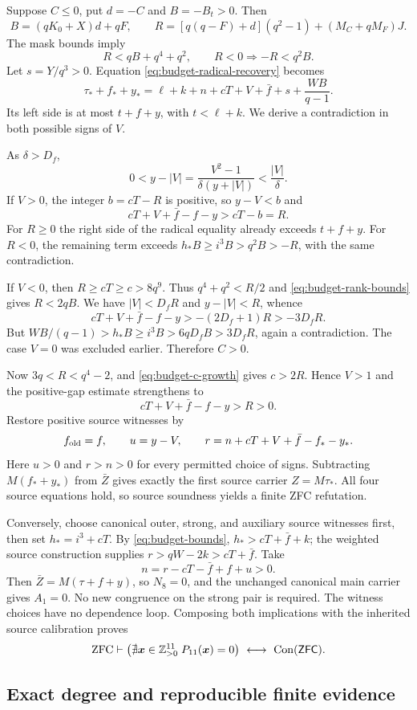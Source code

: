 Suppose $C\le0$, put $d=-C$ and $B=-B_t>0$.  Then
\[
 B=(qK_0+X)d+qF,\qquad
 R=[q(q-F)+d](q^2-1)+(M_C+qM_F)J.
\]
The mask bounds imply
\begin{equation}
 R<qB+q^4+q^2,\qquad R<0\Longrightarrow -R<q^2B.
 \label{eq:budget-rank-bounds}
\end{equation}
Let $s=Y/q^3>0$.  Equation \eqref{eq:budget-radical-recovery} becomes
\[
 \tau_*+f_*+y_*
  =\ell+k+n+cT+V+\bar f+s+\frac{WB}{q-1}.
\]
Its left side is at most $t+f+y$, with $t<\ell+k$.
We derive a contradiction in both possible signs of $V$.

As $\delta>D_f$,
\[
 0<y-|V|=\frac{V^2-1}{\delta(y+|V|)}<\frac{|V|}{\delta}.
\]
If $V>0$, the integer $b=cT-R$ is positive, so $y-V<b$ and
\[
 cT+V+\bar f-f-y>cT-b=R.
\]
For $R\ge0$ the right side of the radical equality already exceeds
$t+f+y$.  For $R<0$, the remaining term exceeds
$h_*B\ge i^3B>q^2B>-R$, with the same contradiction.

If $V<0$, then $R\ge cT\ge c>8q^9$.  Thus
$q^4+q^2<R/2$ and \eqref{eq:budget-rank-bounds} gives $R<2qB$.
We have $|V|<D_fR$ and $y-|V|<R$, whence
\[
 cT+V+\bar f-f-y>-(2D_f+1)R>-3D_fR.
\]
But $WB/(q-1)>h_*B\ge i^3B>6qD_fB>3D_fR$, again a
contradiction.  The case $V=0$ was excluded earlier.  Therefore $C>0$.

Now $3q<R<q^4-2$, and \eqref{eq:budget-c-growth} gives $c>2R$.
Hence $V>1$ and the positive-gap estimate strengthens to
\[
 cT+V+\bar f-f-y>R>0.
\]
Restore positive source witnesses by
\[
 f_{\rm old}=f,\qquad u=y-V,\qquad
 r=n+cT+V+\bar f-f_*-y_*.
\]
Here $u>0$ and $r>n>0$ for every permitted choice of signs.
Subtracting $M(f_*+y_*)$ from $\bar Z$ gives exactly the first source
carrier $Z=M\tau_*$.  All four source equations hold, so source
soundness yields a finite ZFC refutation.

Conversely, choose canonical outer, strong, and auxiliary source
witnesses first, then set $h_*=i^3+cT$.
By \eqref{eq:budget-bounds}, $h_*>cT+\bar f+k$; the weighted
source construction supplies $r>qW-2k>cT+\bar f$.
Take
\[
 n=r-cT-\bar f+f+u>0.
\]
Then $\bar Z=M(\tau+f+y)$, so $N_8=0$, and the unchanged canonical
main carrier gives $A_1=0$.  No new congruence on the strong pair is
required.  The witness choices have no dependence loop.
Composing both implications with the inherited source calibration proves
\[
 \mathrm{ZFC}\vdash
 \bigl(\nexists\boldsymbol{x}\in\Zp^{11}\;
       P_{11}(\boldsymbol{x})=0\bigr)\ \longleftrightarrow\ \ConZFC.
\]

\subsection{Exact degree and reproducible finite evidence}


